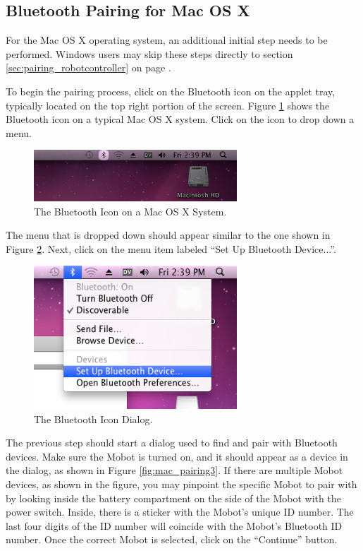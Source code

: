 \documentclass{article}
\begin{document}
\subsection{Bluetooth Pairing for Mac OS X}
For the Mac OS X operating system, an additional initial step needs to be performed.
Windows users may skip these steps directly to section \ref{sec:pairing_robotcontroller}
on page \pageref{sec:pairing_robotcontroller}.

To begin the pairing process, click on the Bluetooth icon on the applet tray,
typically located on the top right portion of the screen. Figure \ref{fig:mac_pairing1}
shows the Bluetooth icon on a typical Mac OS X system. Click on the icon to drop down
a menu.
\begin{figure}[H]
\begin{center}
\includegraphics[width=3in]{images/mac_pairing1.png}
\end{center}
\caption{\label{fig:mac_pairing1} The Bluetooth Icon on a Mac OS X System.}
\end{figure}

The menu that is dropped down should appear similar to the one shown in Figure \ref{fig:mac_pairing2}.
Next, click on the menu item labeled ``Set Up Bluetooth Device...''.
\begin{figure}[H]
\begin{center}
\includegraphics[width=3in]{images/mac_pairing2.png}
\end{center}
\caption{\label{fig:mac_pairing2} The Bluetooth Icon Dialog.}
\end{figure}

The previous step should start a dialog used to find and pair with Bluetooth devices. Make sure the
Mobot is turned on, and it should appear as a device in the dialog, as shown in Figure \ref{fig:mac_pairing3}.
If there are multiple Mobot devices, as shown in the figure, you may pinpoint the specific Mobot to pair
with by looking inside the battery compartment on the side of the Mobot with the power switch. Inside,
there is a sticker with the Mobot's unique ID number. The last four digits of the ID number will
coincide with the Mobot's Bluetooth ID number. Once the correct Mobot is selected, click on the ``Continue''
button.
\end{document}
